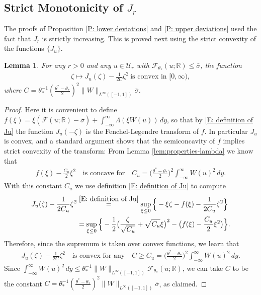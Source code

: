 \documentclass[12pt]{amsart}
\newtheorem{lemma}{Lemma}
\begin{document}
\subsection{Strict Monotonicity of $J_{r}$} The proofs of Proposition \ref{P: lower deviations} and \ref{P: upper deviations} used the fact that $J_{r}$ is strictly increasing.  This is proved next using the strict convexity of the functions $\{ J_{u} \}$.

	
	\begin{lemma} For any $r > 0$ and any $u \in \mathcal{U}_{r}$ with $\mathscr{F}_{\theta_{*}}(u;\mathbb{R}) \leq \bar{\sigma}$, the function
		\begin{gather} \label{eqn:convexity-ju}
			\zeta \mapsto J_{ u } ( \zeta ) - \frac{ 1 }{ 2 C } \zeta^2
		~ \text{is~convex~in~}[0,\infty),
		\end{gather}
	where $C = \theta_{*}^{-1} \left( \frac{ \theta^{*} - \theta_{*} }{ 2 } \right)^{2} \|W\|_{L^{\infty}([-1,1])} \bar{\sigma}$. \end{lemma}
	
		\begin{proof} Here it is convenient to define $ f ( \xi ) =  \xi ( \bar{\mathscr{F}}(u; \mathbb{R}) - \bar{\sigma}) + \int_{-\infty}^{\infty} \Lambda ( \xi W(u) ) \, dy  $, so that by \eqref{E: definition of Ju} the function $ J_{ u } ( - \zeta ) $ is the Fenchel-Legendre transform of $ f $. In particular $ J_{ u } $ is convex, and a standard argument shows that the semiconcavity of $ f $ implies strict convexity of the transform: From Lemma \ref{lem:properties-lambda} we know that
		\begin{align*}
			f ( \xi ) - \frac{ C_{ u } }{ 2 } \xi^2
			\quad \text{is concave for} \quad
			C_{ u } = \Big( \frac{ \theta^* - \theta_* }{ 2 } \Big)^2 \int_{ - \infty }^{ \infty } W( u )^2  \, dy .
		\end{align*}
		With this constant $ C_{ u } $ we use definition \eqref{E: definition of Ju} to compute
		\begin{align*}
			J_{ u } ( \zeta ) - \frac{ 1 }{ 2  C_{ u } } \zeta^2 
			& \stackrel{ \eqref{E: definition of Ju} }{ = } \sup_{ \xi \leq 0 } \Big\{ - \xi \zeta - f ( \xi ) - \frac{ 1 }{ 2 C_{ u } } \zeta^2  \Big\} \\
			&=  \sup_{ \xi \leq 0 } \Big\{ - \frac{ 1 }{ 2 } \big( \frac{ \zeta }{ \sqrt{ C_{ u } } } + \sqrt{ C_{ u } } \xi \big)^2 - \big( f ( \xi ) - \frac{  C_{ u } }{ 2 } \xi^2 \big)  \Big\} .
		\end{align*}
		Therefore, since the supremum is taken over convex functions, we learn that
		\begin{align*}
			J_{ u } ( \zeta ) - \frac{ 1 }{ 2 C } \zeta^2 
			\quad \text{is convex for any} \quad 
			C \geq C_{ u } = \Big( \frac{ \theta^* - \theta_* }{ 2 } \Big)^2 \int_{ - \infty }^{ \infty } W( u )^2  \, dy .
		\end{align*}
		Since $\int_{-\infty}^{\infty} W(u)^{2} \, dy \leq \theta_{*}^{-1} \|W\|_{L^{\infty}([-1,1])} \mathscr{F}_{\theta_{*}}(u;\mathbb{R})$, we can take $C$ to be the constant $C = \theta_{*}^{-1} \left( \frac{ \theta^{*} - \theta_{*} }{ 2 } \right)^{2} \|W\|_{L^{\infty}([-1,1])} \bar{\sigma}$, as claimed.
	\end{proof}
		
\end{document}
